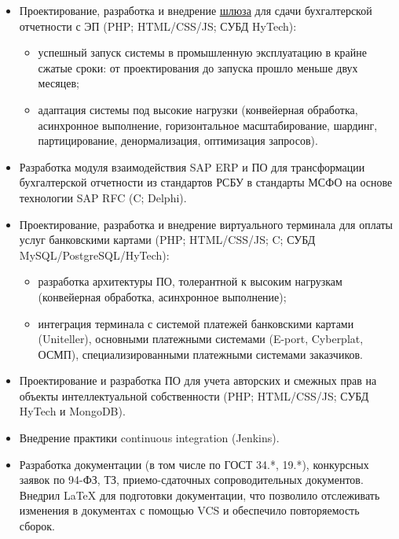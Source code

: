{\begin{itemize}
\begin{itemize}
		\item разрабатывал OLAP-отчеты (собственный движок) по всем сферам деятельности ФСС РФ (бухгалтерия, путевки, профилактика на вредных производствах, выездные и камеральные проверки и т.д.);
		\item спроектировал, разработал и успешно внедрил полнотекстовый поиск по судебным документам ФСС РФ с помощью Sphinx;
		\item адаптировал портал под высокие нагрузки (горизонтальное масштабирование, шардинг, партицирование, денормализация, оптимизация запросов).
	\end{itemize}
	\item Проектирование, разработка и внедрение \href{http://f4.fss.ru}{\underline{шлюза}} для сдачи бухгалтерской отчетности с ЭП (PHP; HTML/CSS/JS; СУБД HyTech):
	\begin{itemize}
		\item успешный запуск системы в промышленную эксплуатацию в крайне сжатые сроки: от проектирования до запуска прошло меньше двух месяцев;
		\item адаптация системы под высокие нагрузки (конвейерная обработка, асинхронное выполнение, горизонтальное масштабирование, шардинг, партицирование, денормализация, оптимизация запросов).
	\end{itemize}
	\item Разработка модуля взаимодействия SAP ERP и ПО для трансформации бухгалтерской отчетности из стандартов РСБУ в стандарты МСФО на основе технологии SAP RFC (C; Delphi).	
	\item Проектирование, разработка и внедрение виртуального терминала для оплаты услуг банковскими картами (PHP; HTML/CSS/JS; C; СУБД MySQL/PostgreSQL/HyTech):
	\begin{itemize}
    	\item разработка архитектуры ПО, толерантной к высоким нагрузкам (конвейерная обработка, асинхронное выполнение);
	    \item интеграция терминала с системой платежей банковскими картами (Uniteller), основными платежными системами (E-port, Cyberplat, ОСМП), специализированными платежными системами заказчиков.
	\end{itemize}
	\item Проектирование и разработка ПО для учета авторских и смежных прав на объекты интеллектуальной собственности (PHP; HTML/CSS/JS; СУБД HyTech и MongoDB).
	\item Внедрение практики continuous integration (Jenkins).
	\item Разработка документации (в том числе по ГОСТ 34.*, 19.*), конкурсных заявок по 94-ФЗ, ТЗ, приемо-сдаточных сопроводительных документов. Внедрил LaTeX для подготовки документации, что позволило отслеживать изменения в документах с помощью VCS и обеспечило повторяемость сборок.
\end{itemize}}

